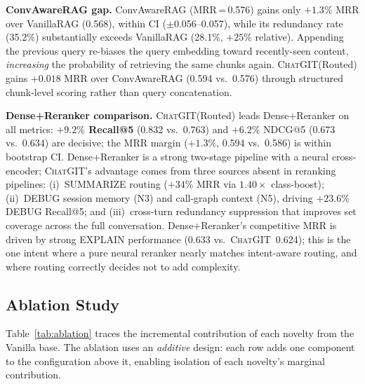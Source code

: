 \documentclass[runningheads]{llncs}
\newcommand{\chatgit}{\textsc{ChatGIT}\xspace}
\begin{document}
\textbf{ConvAwareRAG gap.}
ConvAwareRAG (MRR\,=\,0.576) gains only $+1.3\%$ MRR over
VanillaRAG (0.568), within CI ($\pm$0.056--0.057),
while its redundancy rate (35.2\%) substantially exceeds VanillaRAG
(28.1\%, $+25\%$ relative). Appending the previous query
re-biases the query embedding toward recently-seen content,
\emph{increasing} the probability of retrieving the same chunks
again. \chatgit (Routed) gains $+0.018$ MRR over ConvAwareRAG
(0.594 vs.\ 0.576) through structured chunk-level scoring rather
than query concatenation.

\textbf{Dense+Reranker comparison.}
\chatgit (Routed) leads Dense+Reranker on all metrics:
\textbf{$+9.2\%$ Recall@5} (0.832 vs.\ 0.763) and $+6.2\%$ NDCG@5
(0.673 vs.\ 0.634) are decisive; the MRR margin ($+1.3\%$,
0.594 vs.\ 0.586) is within bootstrap CI.
Dense+Reranker is a strong two-stage pipeline with a neural
cross-encoder; \chatgit's advantage comes from three sources
absent in reranking pipelines: (i)~SUMMARIZE routing ($+34\%$ MRR
via $1.40\times$ class-boost); (ii)~DEBUG session memory (N3) and
call-graph context (N5), driving $+23.6\%$ DEBUG Recall@5; and
(iii)~cross-turn redundancy suppression that improves set coverage
across the full conversation. Dense+Reranker's competitive MRR
is driven by strong EXPLAIN performance (0.633 vs.\ \chatgit\
0.624); this is the one intent where a pure neural reranker
nearly matches intent-aware routing, and where routing correctly
decides not to add complexity.

\subsection{Ablation Study}

Table~\ref{tab:ablation} traces the incremental contribution of
each novelty from the Vanilla base. The ablation uses an
\emph{additive} design: each row adds one component to the
configuration above it, enabling isolation of each novelty's
marginal contribution.
\end{document}
